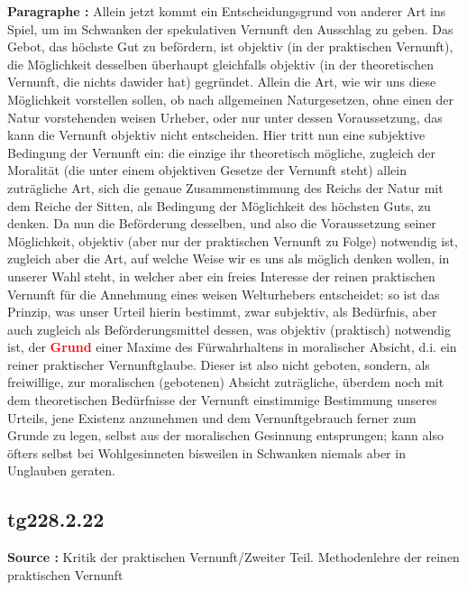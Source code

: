 \documentclass[a4paper,12pt,twoside]{book}
\newcommand{\match}[1]{\textcolor{red}{\textbf{#1}}}
\begin{document}
	\noindent\textbf{Paragraphe : }Allein jetzt kommt ein Entscheidungsgrund von anderer Art ins Spiel, um im Schwanken der spekulativen Vernunft den Ausschlag zu geben. Das Gebot, das höchste Gut zu befördern, ist objektiv (in der praktischen Vernunft), die Möglichkeit desselben überhaupt gleichfalls objektiv (in der theoretischen Vernunft, die nichts dawider hat) gegründet. Allein die Art, wie wir uns diese Möglichkeit vorstellen sollen, ob nach allgemeinen Naturgesetzen, ohne einen der Natur vorstehenden weisen Urheber, oder nur unter dessen Voraussetzung, das kann die Vernunft objektiv nicht entscheiden. Hier tritt nun eine subjektive Bedingung der Vernunft ein: die einzige ihr theoretisch mögliche, zugleich der Moralität (die unter einem objektiven Gesetze der Vernunft steht) allein zuträgliche Art, sich die genaue Zusammenstimmung des Reichs der Natur mit dem Reiche der Sitten, als Bedingung der Möglichkeit des höchsten Guts, zu denken. Da nun die Beförderung desselben, und also die Voraussetzung seiner Möglichkeit, objektiv (aber nur der praktischen Vernunft zu Folge) notwendig ist, zugleich aber die Art, auf welche Weise wir es uns als möglich denken wollen, in unserer Wahl steht, in welcher aber ein freies Interesse der reinen praktischen Vernunft für die Annehmung eines weisen Welturhebers entscheidet: so ist das Prinzip, was unser Urteil hierin bestimmt, zwar subjektiv, als Bedürfnis, aber auch zugleich als Beförderungsmittel dessen, was objektiv (praktisch) notwendig ist, der \match{Grund} einer Maxime des Fürwahrhaltens in moralischer Absicht, d.i. ein reiner praktischer Vernunftglaube. Dieser ist also nicht geboten, sondern, als freiwillige, zur moralischen (gebotenen) Absicht zuträgliche, überdem noch mit dem theoretischen Bedürfnisse der Vernunft einstimmige Bestimmung unseres Urteils, jene Existenz anzunehmen  und dem Vernunftgebrauch ferner zum Grunde zu legen, selbst aus der moralischen Gesinnung entsprungen; kann also öfters selbst bei Wohlgesinneten bisweilen in Schwanken niemals aber in Unglauben geraten. 
	
	\subsection*{tg228.2.22} 
	\textbf{Source : }Kritik der praktischen Vernunft/Zweiter Teil. Methodenlehre der reinen praktischen Vernunft\\  
	
\end{document}
